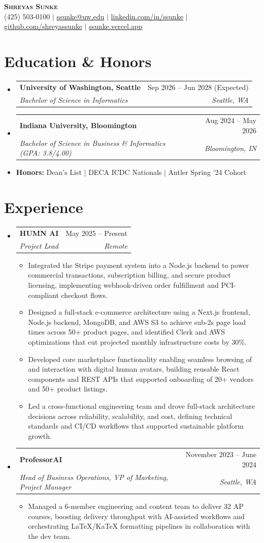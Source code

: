 \documentclass[letterpaper,11pt]{article}
\makeatletter
\newcommand{\resumeItem}[1]{\item\small{#1 \vspace{-2pt}}}
\newcommand{\resumeSubheading}[4]{\vspace{-2pt}\item\begin{tabular*}{0.97\textwidth}[t]{l@{\extracolsep{\fill}}r}\textbf{#1} & #2 \\\textit{\small#3} & \textit{\small #4} \\\end{tabular*}\vspace{-7pt}}
\newcommand{\resumeSubHeadingListStart}{\begin{itemize}[leftmargin=0.15in, label={}]}
\newcommand{\resumeSubHeadingListEnd}{\end{itemize}}
\newcommand{\resumeItemListStart}{\begin{itemize}}
\newcommand{\resumeItemListEnd}{\end{itemize}\vspace{-5pt}}
\makeatother
\begin{document}
\begin{center}
    \textbf{\Huge \scshape Shreyas Sunke} \\ \vspace{1pt}
    \small (425) 503-0100 $|$ \href{mailto:ssunke@uw.edu}{ssunke@uw.edu} $|$
    \href{https://linkedin.com/in/ssunke}{linkedin.com/in/ssunke} $|$
    \href{https://github.com/shreyassunke}{github.com/shreyassunke} $|$
    \href{https://ssunke.vercel.app/}{ssunke.vercel.app}
\end{center}

\section{Education \& Honors}
  \resumeSubHeadingListStart
    \resumeSubheading
      {University of Washington, Seattle}{Sep 2026 -- Jun 2028 (Expected)}
      {Bachelor of Science in Informatics}{Seattle, WA}
    \resumeSubheading
      {Indiana University, Bloomington}{Aug 2024 -- May 2026}
      {Bachelor of Science in Business \& Informatics (GPA: 3.8/4.00)}{Bloomington, IN}
    \item \small{\textbf{Honors:} Dean's List $|$ DECA ICDC Nationals $|$ Antler Spring '24 Cohort}
  \resumeSubHeadingListEnd

\section{Experience}
  \resumeSubHeadingListStart
    \resumeSubheading
      {HUMN AI}{May 2025 -- Present}
      {Project Lead}{Remote}
      \resumeItemListStart
        \resumeItem{Integrated the Stripe payment system into a Node.js backend to power commercial transactions, subscription billing, and secure product licensing, implementing webhook-driven order fulfillment and PCI-compliant checkout flows.}
        \resumeItem{Designed a full-stack e-commerce architecture using a Next.js frontend, Node.js backend, MongoDB, and AWS S3 to achieve sub-2s page load times across 50+ product pages, and identified Clerk and AWS optimizations that cut projected monthly infrastructure costs by 30\%.}
        \resumeItem{Developed core marketplace functionality enabling seamless browsing of and interaction with digital human avatars, building reusable React components and REST APIs that supported onboarding of 20+ vendors and 50+ product listings.}
        \resumeItem{Led a cross-functional engineering team and drove full-stack architecture decisions across reliability, scalability, and cost, defining technical standards and CI/CD workflows that supported sustainable platform growth.}
      \resumeItemListEnd
    \resumeSubheading
      {ProfessorAI}{November 2023 -- June 2024}
      {Head of Business Operations, VP of Marketing, Project Manager}{Seattle, WA}
      \resumeItemListStart
        \resumeItem{Managed a 6-member engineering and content team to deliver 32 AP courses, boosting delivery throughput with AI-assisted workflows and orchestrating LaTeX/KaTeX formatting pipelines in collaboration with the dev team.}
      \resumeItemListEnd
  \resumeSubHeadingListEnd
\end{document}
